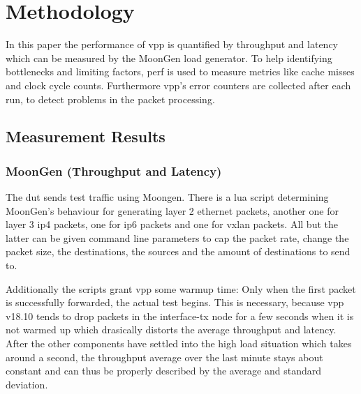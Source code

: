 
\section{Methodology}
\label{sec:methodology}






In this paper the performance of \Ac{vpp} is quantified by throughput
and latency which can be measured by the MoonGen
\cite{emmerich2015moongen} load generator. To help identifying
bottlenecks and limiting factors, \Ac{perf} is used to measure metrics
like cache misses and clock cycle counts. Furthermore \Ac{vpp}'s error
counters are collected after each run, to detect problems in the
packet processing.


\subsection{Measurement Results}



\subsubsection{MoonGen (Throughput and Latency)} 


The \Ac{dut} sends test traffic using Moongen. There is a lua script
determining MoonGen's behaviour for generating layer 2 ethernet
packets, another one for layer 3 \Ac{ip4} packets, one for \Ac{ip6}
packets and one for \Ac{vxlan} packets. All but the latter can be
given command line parameters to cap the packet rate, change the
packet size, the destinations, the sources and the amount of
destinations to send to.

Additionally the scripts grant \Ac{vpp} some warmup time: Only when
the first packet is successfully forwarded, the actual test begins.
This is necessary, because \Ac{vpp} v18.10 tends to drop packets in
the interface-tx node for a few seconds when it is not warmed up which
drasically distorts the average throughput and latency. After the
other components have settled into the high load situation which takes
around a second, the throughput average over the last minute stays
about constant and can thus be properly described by the average and
standard deviation.

